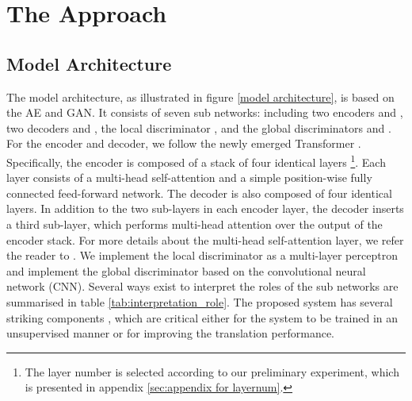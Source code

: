 \documentclass[11pt,a4paper]{article}
\begin{document}
\section{The Approach}
\subsection{Model Architecture}
The model architecture, as illustrated in figure \ref{model architecture}, is based on the AE and GAN. It consists of seven sub networks: including two encoders  and , two decoders  and , the local discriminator , and the global discriminators  and . For the encoder and decoder, we follow the newly emerged Transformer \cite{Vaswani2017Attention}. Specifically, the encoder is composed of a stack of four identical layers \footnote{The layer number is selected according to our preliminary experiment, which is presented in appendix \ref{sec:appendix for layernum}.}. Each layer consists of a multi-head self-attention and a simple position-wise fully connected feed-forward network. The decoder is also composed of four identical layers. In addition to the two sub-layers in each encoder layer, the decoder inserts a third sub-layer, which performs multi-head attention over the output of the encoder stack. For more details about the multi-head self-attention layer, we refer the reader to \cite{Vaswani2017Attention}. We implement the local discriminator as a multi-layer perceptron and implement the global discriminator based on the convolutional neural network (CNN). Several ways exist to interpret the roles of the sub networks are summarised in table \ref{tab:interpretation_role}. The proposed system has several striking components , which are critical either for the system to be trained in an unsupervised manner or for improving the translation performance.
\begin{table}[htb]
\centering
{}
\caption{Interpretation of the roles for the subnetworks in the proposed system.}
\label{tab:interpretation_role}
\end{table}
\end{document}
